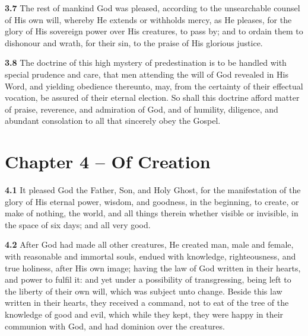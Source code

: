 \par\textbf{3.7} The rest of mankind God was pleased, according to the unsearchable counsel of His own will, whereby He extends or withholds mercy, as He pleases, for the glory of His sovereign power over His creatures, to pass by; and to ordain them to dishonour and wrath, for their sin, to the praise of His glorious justice.   

\par\textbf{3.8} The doctrine of this high mystery of predestination is to be handled with special prudence and care, that men attending the will of God revealed in His Word, and yielding obedience thereunto, may, from the certainty of their effectual vocation, be assured of their eternal election. So shall this doctrine afford matter of praise, reverence, and admiration of God, and of humility, diligence, and abundant consolation to all that sincerely obey the Gospel.  

\section{Chapter 4 -- Of Creation}

\par\textbf{4.1} It pleased God the Father, Son, and Holy Ghost, for the manifestation of the glory of His eternal power, wisdom, and goodness, in the beginning, to create, or make of nothing, the world, and all things therein whether visible or invisible, in the space of six days; and all very good.   

\par\textbf{4.2} After God had made all other creatures, He created man, male and female, with reasonable and immortal souls, endued with knowledge, righteousness, and true holiness, after His own image; having the law of God written in their hearts, and power to fulfil it: and yet under a possibility of transgressing, being left to the liberty of their own will, which was subject unto change. Beside this law written in their hearts, they received a command, not to eat of the tree of the knowledge of good and evil, which while they kept, they were happy in their communion with God, and had dominion over the creatures.  

